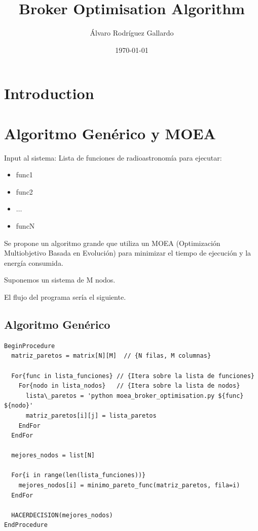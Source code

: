 \documentclass{article}
\title{Broker Optimisation Algorithm}
\author{Álvaro Rodríguez Gallardo}
\date{\today}
\begin{document}
\maketitle

\section{Introduction}

\section{Algoritmo Genérico y MOEA}

Input al sistema: Lista de funciones de radioastronomía para ejecutar:

\begin{itemize} %
  \item func1
  \item func2
  \item $\ldots$
  \item funcN
\end{itemize} %

Se propone un algoritmo grande que utiliza un MOEA (Optimización Multiobjetivo Basada en Evolución) para minimizar el tiempo de ejecución y la energía consumida.

Suponemos un sistema de M nodos.

El flujo del programa sería el siguiente.

\subsection{Algoritmo Genérico}

\begin{verbatim}
BeginProcedure
  matriz_paretos = matrix[N][M]  // {N filas, M columnas}
  
  For{func in lista_funciones} // {Itera sobre la lista de funciones}
    For{nodo in lista_nodos}   // {Itera sobre la lista de nodos}
      lista\_paretos = 'python moea_broker_optimisation.py ${func} ${nodo}'
      matriz_paretos[i][j] = lista_paretos
    EndFor
  EndFor
  
  mejores_nodos = list[N]
  
  For{i in range(len(lista_funciones))}
    mejores_nodos[i] = minimo_pareto_func(matriz_paretos, fila=i)
  EndFor
  
  HACERDECISION(mejores_nodos)
EndProcedure
\end{verbatim}
\end{document}
